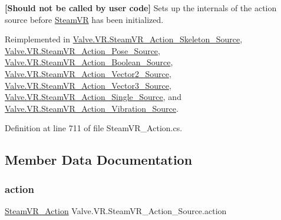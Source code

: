 {\bfseries{\mbox{[}Should not be called by user code\mbox{]}}} Sets up the internals of the action source before \mbox{\hyperlink{class_valve_1_1_v_r_1_1_steam_v_r}{Steam\+VR}} has been initialized. 



Reimplemented in \mbox{\hyperlink{class_valve_1_1_v_r_1_1_steam_v_r___action___skeleton___source_a8341927740ab2699476e66d08d3124d3}{Valve.\+V\+R.\+Steam\+V\+R\+\_\+\+Action\+\_\+\+Skeleton\+\_\+\+Source}}, \mbox{\hyperlink{class_valve_1_1_v_r_1_1_steam_v_r___action___pose___source_a2e4aacdbfb9d1a2c5edffcd42e2c3c0e}{Valve.\+V\+R.\+Steam\+V\+R\+\_\+\+Action\+\_\+\+Pose\+\_\+\+Source}}, \mbox{\hyperlink{class_valve_1_1_v_r_1_1_steam_v_r___action___boolean___source_a35bf3460bf62e92bc67e371b16125c39}{Valve.\+V\+R.\+Steam\+V\+R\+\_\+\+Action\+\_\+\+Boolean\+\_\+\+Source}}, \mbox{\hyperlink{class_valve_1_1_v_r_1_1_steam_v_r___action___vector2___source_aca501fd21acaec4eb089bdf652adf20c}{Valve.\+V\+R.\+Steam\+V\+R\+\_\+\+Action\+\_\+\+Vector2\+\_\+\+Source}}, \mbox{\hyperlink{class_valve_1_1_v_r_1_1_steam_v_r___action___vector3___source_a264e92c04f83a54bc6123c529db86a8c}{Valve.\+V\+R.\+Steam\+V\+R\+\_\+\+Action\+\_\+\+Vector3\+\_\+\+Source}}, \mbox{\hyperlink{class_valve_1_1_v_r_1_1_steam_v_r___action___single___source_a97639a0235a7e499841ac96ca2642f83}{Valve.\+V\+R.\+Steam\+V\+R\+\_\+\+Action\+\_\+\+Single\+\_\+\+Source}}, and \mbox{\hyperlink{class_valve_1_1_v_r_1_1_steam_v_r___action___vibration___source_a4fcbc01468b2bfd6be93ef24f6ae1aa3}{Valve.\+V\+R.\+Steam\+V\+R\+\_\+\+Action\+\_\+\+Vibration\+\_\+\+Source}}.



Definition at line 711 of file Steam\+V\+R\+\_\+\+Action.\+cs.



\subsection{Member Data Documentation}
\mbox{\label{class_valve_1_1_v_r_1_1_steam_v_r___action___source_aa38bfb4ea2779a73aa3285f861e2462e}} 
\subsubsection{\texorpdfstring{action}{action}}
{\footnotesize\ttfamily \mbox{\hyperlink{class_valve_1_1_v_r_1_1_steam_v_r___action}{Steam\+V\+R\+\_\+\+Action}} Valve.\+V\+R.\+Steam\+V\+R\+\_\+\+Action\+\_\+\+Source.\+action\hspace{0.3cm}{\ttfamily [protected]}}



